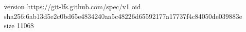 version https://git-lfs.github.com/spec/v1
oid sha256:6ab13d5e2c0bd65e4834240aa5c48226d65592177a17737f4c84050de039883e
size 11068
